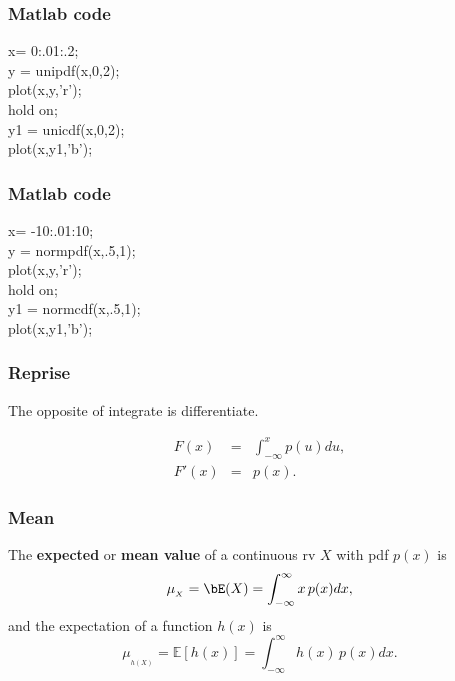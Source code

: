 \begin{frame}[fragile]\frametitle{Matlab code}

\begin{tabbing}
x= 0:.01:.2; \\
y = unipdf(x,0,2);\\
plot(x,y,'r');\\
hold on;\\
y1 = unicdf(x,0,2);\\
plot(x,y1,'b');\\
\end{tabbing}
\end{frame}


\begin{frame}[fragile]\frametitle{Matlab code}

\begin{tabbing}
x= -10:.01:10; \\
y = normpdf(x,.5,1);\\
plot(x,y,'r');\\
hold on;\\
y1 = normcdf(x,.5,1);\\
plot(x,y1,'b');\\
\end{tabbing}
\end{frame}



\begin{frame}[fragile]\frametitle{Reprise}


The opposite of integrate is differentiate. 

\begin{prop}
\begin{eqnarray*}
F(x) &=& \int_{-\infty}^x p(u) du,  \\
F'(x)& =& p(x).
\end{eqnarray*}

\end{prop}
\end{frame}


\begin{frame}[fragile]\frametitle{Mean}

\begin{defn}
The {\bf expected} or {\bf mean value} of a continuous rv $X$ with
pdf $p(x)$ is
$$\mu_{_X} = \bE(X) = \int_{-\infty}^{\infty} x \, p(x) dx,$$
and the expectation of a function $h(x)$ is
$$\mu_{_{h(X)}} = \mathbb E[h(x)] = \int_{-\infty}^{\infty} h(x) \, p(x) dx.$$

\end{defn}

\end{frame}



